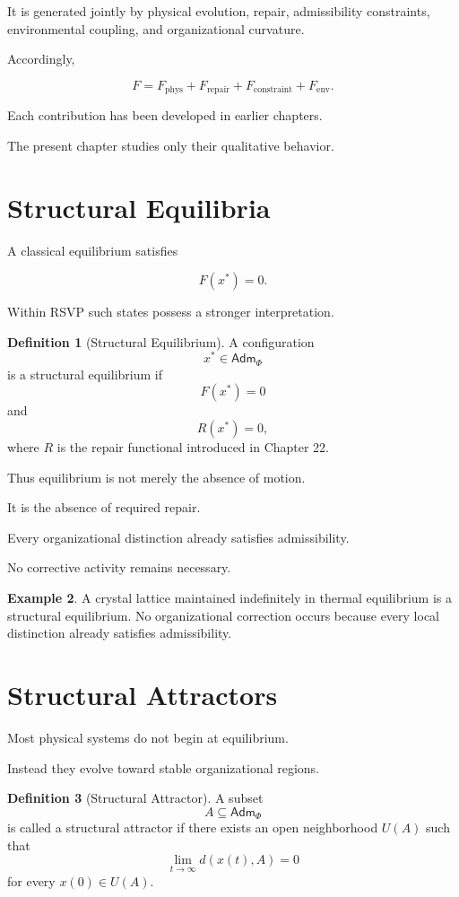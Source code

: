 \documentclass[11pt,oneside]{book}
\numberwithin{equation}{chapter}
\theoremstyle{definition}
\newtheorem{definition}{Definition}[chapter]
\newtheorem{example}[definition]{Example}
\theoremstyle{plain}
\newcommand{\Adm}{\mathsf{Adm}}
\begin{document}
It is generated jointly by physical evolution, repair, admissibility
constraints, environmental coupling, and organizational curvature.

Accordingly,

\[
F
=
F_{\mathrm{phys}}
+
F_{\mathrm{repair}}
+
F_{\mathrm{constraint}}
+
F_{\mathrm{env}}.
\]

Each contribution has been developed in earlier chapters.

The present chapter studies only their qualitative behavior.

\section{Structural Equilibria}

A classical equilibrium satisfies

\[
F(x^*) = 0.
\]

Within RSVP such states possess a stronger interpretation.

\begin{definition}[Structural Equilibrium]
A configuration
\[
x^*
\in
\Adm_\Phi
\]
is a structural equilibrium if
\[
F(x^*)=0
\]
and
\[
R(x^*)=0,
\]
where \(R\) is the repair functional introduced in Chapter 22.
\end{definition}

Thus equilibrium is not merely the absence of motion.

It is the absence of required repair.

Every organizational distinction already satisfies admissibility.

No corrective activity remains necessary.

\begin{example}
A crystal lattice maintained indefinitely in thermal equilibrium is a
structural equilibrium. No organizational correction occurs because every
local distinction already satisfies admissibility.
\end{example}

\section{Structural Attractors}

Most physical systems do not begin at equilibrium.

Instead they evolve toward stable organizational regions.

\begin{definition}[Structural Attractor]
A subset
\[
A
\subseteq
\Adm_\Phi
\]
is called a structural attractor if there exists an open neighborhood
\(U(A)\) such that
\[
\lim_{t\rightarrow\infty}
d(x(t),A)
=
0
\]
for every \(x(0)\in U(A)\).
\end{definition}
\end{document}
